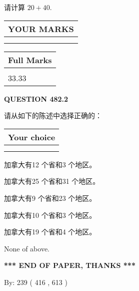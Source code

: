 \documentclass{ctexart}
\begin{document}
  
 
请计算 $ %
20 +  %
40 $.
 

 

 
  
\vspace{0.2in}
  
\noindent\begin{tabular}{|l|}
\hline
 YOUR MARKS  \\
\hline
 \\ 
 \\ 
\hline
\end{tabular}
\hspace{0.05in} \begin{tabular}{|l|}
\hline
 Full Marks  \\
\hline
 \\ 
33.33 \\
\hline
\end{tabular}
{\textbf{\Large{QUESTION
482.2 
}}}
  
  
请从如下的陈述中选择正确的：
  
  
\noindent\hspace{3.0in} \begin{tabular}{|l|}
\hline
Your choice \\
\hline
 \\ 
 \\ 
\hline
\end{tabular}
  
  
 
 
加拿大有12 个省和3 个地区。
 
 
加拿大有25 个省和31 个地区。
 
 
加拿大有9 个省和23 个地区。
 
 
加拿大有10 个省和3 个地区。
 
 
加拿大有19 个省和4 个地区。
 
 
 None of above.
 
 
   
   
 \vspace{0.2in}
 
   
   
   
   
\vspace{1.0in} 
{\textbf{\large{ *** END OF PAPER, THANKS *** }}} 
   
   
\hspace{1.0in} By: 
 239 ( 416 ,  613 )
   
\end{document}
